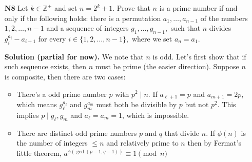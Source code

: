 \documentclass[11pt,a4paper]{article}
\begin{document}
\begin{enumerate}
    Now we have the next one: 
    \begin{lemma}
    	$S_{a^2} \equiv 2E_a + 2aO_a$
    \end{lemma}
    \begin{proof}
    	Again we have the following expansion: 
    	\begin{equation}
    		S_{a^2} = \sum^{p-1}_{j=1}\frac{a^{2j}}{j}
    		= \sum_{j=1}^{(p - 1)/ 2} \left(\frac{a^{2j}}{j} + \frac{a^{2j + (p - 1)}}{(p - 1)/ 2 + j}\right)
    		\equiv \sum_{j=1}^{(p - 1)/ 2} a^{2j}\left(\frac{1}{j} + \frac{1}{-\frac 12 + j}\right)
    	\end{equation}
        which can then be decomposed into the following: 
        \begin{equation}
        	\sum_{j=1}^{(p - 1)/ 2} \frac{a^{2j}}{j}
        	=2\sum_{j=1}^{(p - 1)/ 2} \frac{a^{2j}}{2j}
        	=2E_a
        \end{equation}
        and also 
        \begin{equation}
        	\sum_{j=1}^{(p - 1)/ 2} \frac{a^{2j}}{-\frac 12 + j}
        	\equiv \sum_{j=1}^{(p - 1)/ 2} \frac{2a^{2j}}{2j - 1}
        	=2a\sum_{j=1}^{(p - 1)/ 2} \frac{a^{2j - 1}}{2j - 1}
        	=2aO_a
        \end{equation}
    \end{proof}
    Therefore considering $a = 2$ we have 
    \begin{equation}
    	S_3 + S_4 - 3S_2
    	\equiv (E_2 - O_2) + (2E_2 + 2\cdot 2\cdot O_2) - 3(E_2 + O_2)
    	= 0
    \end{equation}
    as desired. 
	
	\item [\textbf{N8}] Let $k \in \mathbb{Z}^+$ and set $n=2^k+1.$ Prove that $n$ is a prime number if and only if the following holds: there is a permutation $a_{1},\ldots,a_{n-1}$ of the numbers $1,2, \ldots, n-1$ and a sequence of integers $g_{1},\ldots,g_{n-1},$ such that $n$ divides $g^{a_i}_i - a_{i+1}$ for every $i \in \{1,2,\ldots,n-1\},$ where we set $a_n = a_1.$
	
	\textbf{Solution (partial for now).}
	We note that $n$ is odd. 
	Let's first show that if such sequence exists, then $n$ must be prime (the easier direction). 
	Suppose $n$ is composite, then there are two cases: 
	\begin{itemize}
		\item There's a odd prime number $p$ with $p^2\mid n$. 
		If $a_{\ell+1}=p$ and $a_{m+1}=2p$, which means $g_{\ell}^{a_{\ell}}$ and $g_m^{a_m}$ must both be divisible by $p$ but not $p^2$. This implies $p\mid g_{\ell}, g_m$ and $a_{\ell}=a_m=1$, which is impossible. 
		
		\item There are distinct odd prime numbers $p$ and $q$ that divide $n$. 
		If $\phi(n)$ is the number of integers $\le n$ and relatively prime to $n$ then 
		by Fermat's little theorem, $a^{\phi(\gcd(p-1, q-1))}\equiv 1\pmod{n}$
	\end{itemize}
    
    
    
	
\end{enumerate}
\end{document}
